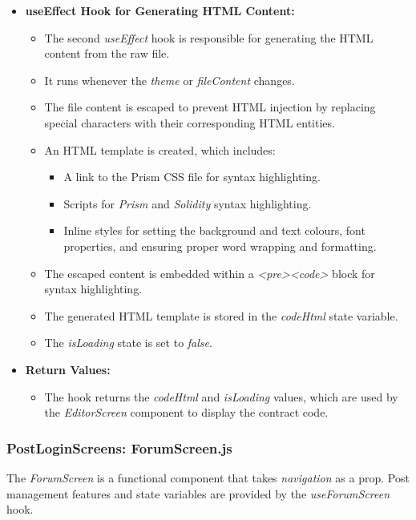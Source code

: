 \begin{itemize}
    \item \textbf{useEffect Hook for Generating HTML Content:}
    \begin{itemize}
        \item The second \textit{useEffect} hook is responsible for generating the HTML content from the raw file.
        \item It runs whenever the \textit{theme} or \textit{fileContent} changes.
        \item The file content is escaped to prevent HTML injection by replacing special characters with their corresponding HTML entities.
        \item An HTML template is created, which includes:
        \begin{itemize}
            \item A link to the Prism CSS file for syntax highlighting.
            \item Scripts for \textit{Prism} and \textit{Solidity} syntax highlighting.
            \item Inline styles for setting the background and text colours, font properties, and ensuring proper word wrapping and formatting.
        \end{itemize}
        \item The escaped content is embedded within a \textit{<pre><code>} block for syntax highlighting.
        \item The generated HTML template is stored in the \textit{codeHtml} state variable.
        \item The \textit{isLoading} state is set to \textit{false}.
    \end{itemize}

    \item \textbf{Return Values:}
    \begin{itemize}
        \item The hook returns the \textit{codeHtml} and \textit{isLoading} values, which are used by the \textit{EditorScreen} component to display the contract code.
    \end{itemize}
\end{itemize}

\subsubsection{PostLoginScreens: ForumScreen.js}

The \textit{ForumScreen} is a functional component that takes \textit{navigation} as a prop. Post management features and state variables are provided by the \textit{useForumScreen} hook.

